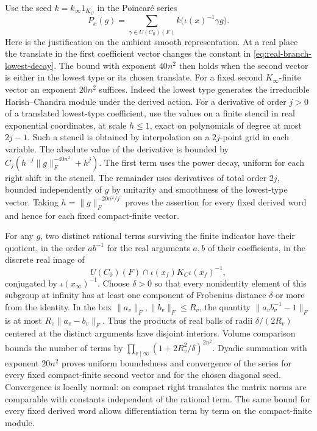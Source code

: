 Use the seed \(k=k_\infty 1_{K_C}\) in the Poincar\'e series
\[
 P_x(g)=\sum_{\gamma\in U(C_0)(F)}
          k\bigl(\iota(x)^{-1}\gamma g\bigr).
\]
Here is the justification on the ambient smooth representation.
At a real place the translate in the first coefficient vector
changes the constant in \eqref{eq:real-branch-lowest-decay}.
The bound with exponent \(40n^2\) then holds when the second
vector is either in the lowest type or its chosen translate.
For a fixed second \(K_\infty\)-finite vector an exponent
\(20n^2\) suffices. Indeed the lowest type generates the
irreducible Harish--Chandra module under the derived action.
For a derivative of order \(j>0\) of a translated lowest-type
coefficient, use the values on a finite stencil in real
exponential coordinates, at scale \(h\le1\), exact on
polynomials of degree at most \(2j-1\). Such a stencil is
obtained by interpolation on a \(2j\)-point grid in each
variable. The absolute value of the derivative is bounded by
\(C_j(h^{-j}\|g\|_F^{-40n^2}+h^j)\).
The first term uses the power decay, uniform for each right
shift in the stencil. The remainder uses derivatives of total
order \(2j\), bounded independently of \(g\) by unitarity and
smoothness of the lowest-type vector. Taking
\(h=\|g\|_F^{-20n^2/j}\) proves the assertion for every fixed
derived word and hence for each fixed compact-finite vector.

For any \(g\), two distinct rational terms surviving the
finite indicator have their quotient, in the order
\(a b^{-1}\) for the real arguments \(a,b\) of their
coefficients, in the discrete real image of
\[
 U(C_0)(F)\cap\iota(x_f)K_C\iota(x_f)^{-1},
\]
conjugated by \(\iota(x_\infty)^{-1}\).
Choose \(\delta>0\) so that every nonidentity element
of this subgroup at infinity has at least one component
of Frobenius distance \(\delta\) or more from the identity.
In the box \(\|a_v\|_F,\|b_v\|_F\le R_v\), the quantity
\(\|a_v b_v^{-1}-1\|_F\) is at most
\(R_v\|a_v-b_v\|_F\). Thus the products of real balls of
radii \(\delta/(2R_v)\) centered at the distinct arguments
have disjoint interiors. Volume comparison bounds the number
of terms by
\(\prod_{v\mid\infty}(1+2R_v^2/\delta)^{2n^2}\).
Dyadic summation with exponent \(20n^2\) proves uniform
boundedness and convergence of the series for every fixed
compact-finite second vector and for the chosen diagonal
seed. Convergence is locally normal: on compact right
translates the matrix norms are comparable with constants
independent of the rational term. The same bound for every
fixed derived word allows differentiation term by term on
the compact-finite module.

